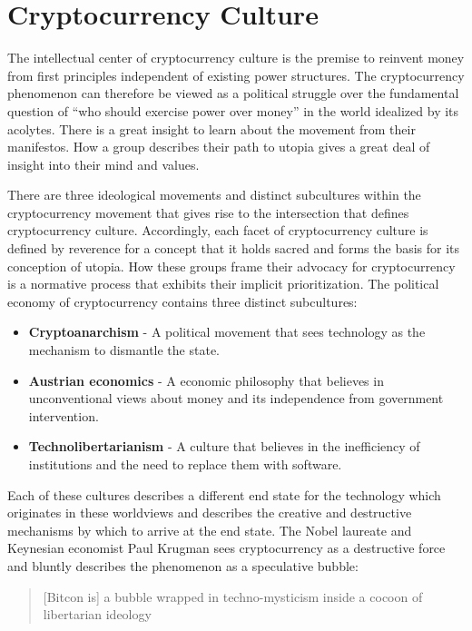 \chapter{Cryptocurrency Culture}

The intellectual center of cryptocurrency culture is the premise to reinvent
money from first principles independent of existing power structures. The
cryptocurrency phenomenon can therefore be viewed as a political struggle over
the fundamental question of ``who should exercise power over money'' in the world
idealized by its acolytes. There is a great insight to learn about the movement
from their manifestos. How a group describes their path to utopia gives a great
deal of insight into their mind and values.

There are three ideological movements and distinct subcultures within the
cryptocurrency movement that gives rise to the intersection that defines
cryptocurrency culture. Accordingly, each facet of cryptocurrency culture is
defined by reverence for a concept that it holds sacred and forms the basis for
its conception of utopia. How these groups frame their advocacy for
cryptocurrency is a normative process that exhibits their implicit
prioritization. The political economy of cryptocurrency contains three distinct
subcultures:

\begin{itemize}
\tightlist
\item
  \textbf{Cryptoanarchism} - A political movement that sees technology as the
    mechanism to dismantle the state.
\item
  \textbf{Austrian economics} - A economic philosophy that believes in
    unconventional views about money and its independence from government
    intervention.
\item
  \textbf{Technolibertarianism} - A culture that believes in the inefficiency of
    institutions and the need to replace them with software.
\end{itemize}

Each of these cultures describes a different end state for the technology which
originates in these worldviews and describes the creative and destructive
mechanisms by which to arrive at the end state. The Nobel laureate and Keynesian
economist Paul Krugman sees cryptocurrency as a destructive force and bluntly
describes \cite{krugman_technobabble_2021, krugman_bitcoin_2018,
krugman_brutal_2021} the phenomenon as a speculative bubble:

\begin{quote}
[Bitcon is] a bubble wrapped in techno-mysticism inside a cocoon of libertarian ideology
\end{quote}

